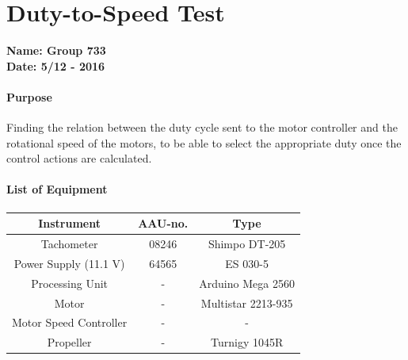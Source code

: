 \chapter{Duty-to-Speed Test}\label{app:duty} 
\textbf{Name: Group 733}\\
\textbf{Date: 5/12 - 2016}

\subsubsection{Purpose}
Finding the relation between the duty cycle sent to the motor controller and the rotational speed of the motors, to be able to select the appropriate duty once the control actions are calculated.

\subsubsection{List of Equipment}
\begin{table}[H]
    \centering
	\begin{tabular}{|c|c|c|}
		\hline%
		\textbf{Instrument}                          &  \textbf{AAU-no.}  &  \textbf{Type}                       \\
		\hline%
		Tachometer                                   &  08246             &  Shimpo DT-205		                   \\
		\hline%
	    Power Supply (11.1 V)                        &  64565             &  ES 030-5                 \\
		\hline%
		Processing Unit                              &  -               & Arduino Mega 2560    \\
		\hline%
		Motor                                        &  -               & Multistar 2213-935     \\
		\hline%
		Motor Speed Controller                       &  -              &  -      \\
		\hline%
		Propeller                                    &  -              & Turnigy 1045R     \\
		\hline%
	\end{tabular}
\end{table}

